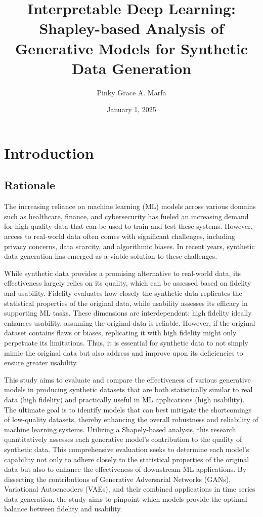 \documentclass{article}
\title{Interpretable Deep Learning: Shapley-based Analysis of Generative Models for Synthetic Data Generation}
\begin{document}
\author{Pinky Grace A. Marfa}
\date{January 1, 2025}

\maketitle

\section{Introduction}

\subsection{Rationale}
The increasing reliance on machine learning (ML) models across various domains such as healthcare, finance, and cybersecurity has fueled an increasing demand for high-quality data that can be used to train and test these systems. However, access to real-world data often comes with significant challenges, including privacy concerns, data scarcity, and algorithmic biases. In recent years, synthetic data generation has emerged as a viable solution to these challenges.

While synthetic data provides a promising alternative to real-world data, its effectiveness largely relies on its quality, which can be assessed based on fidelity and usability. Fidelity evaluates how closely the synthetic data replicates the statistical properties of the original data, while usability assesses its efficacy in supporting ML tasks. These dimensions are interdependent: high fidelity ideally enhances usability, assuming the original data is reliable. However, if the original dataset contains flaws or biases, replicating it with high fidelity might only perpetuate its limitations. Thus, it is essential for synthetic data to not simply mimic the original data but also address and improve upon its deficiencies to ensure greater usability.

This study aims to evaluate and compare the effectiveness of various generative models in producing synthetic datasets that are both statistically similar to real data (high fidelity) and practically useful in ML applications (high usability). The ultimate goal is to identify models that can best mitigate the shortcomings of low-quality datasets, thereby enhancing the overall robustness and reliability of machine learning systems. Utilizing a Shapely-based analysis, this research quantitatively assesses each generative model’s contribution to the quality of synthetic data. This comprehensive evaluation seeks to determine each model’s capability not only to adhere closely to the statistical properties of the original data but also to enhance the effectiveness of downstream ML applications. By dissecting the contributions of Generative Adversarial Networks (GANs), Variational Autoencoders (VAEs), and their combined applications in time series data generation, the study aims to pinpoint which models provide the optimal balance between fidelity and usability.
\end{document}
